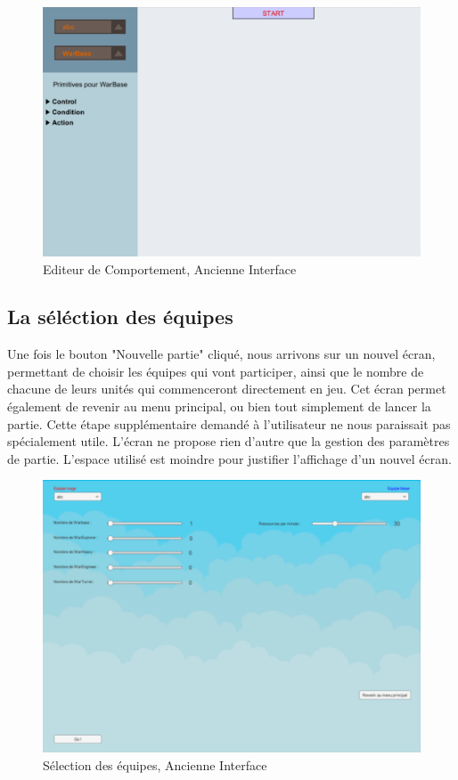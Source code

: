 \documentclass{report}
\begin{document}
\begin{enumerate}
\begin{figure}[!h]
	\centering
		\includegraphics[scale=0.35]{BehaviorScreenOld}
	\caption{Editeur de Comportement, Ancienne Interface}
\end{figure}

\end{enumerate}


\subsection{La séléction des équipes}
Une fois le bouton "Nouvelle partie" cliqué, nous arrivons sur un nouvel écran, permettant de choisir les équipes qui vont participer, ainsi que le nombre de chacune de leurs unités qui commenceront directement en jeu.\newline
Cet écran permet également de revenir au menu principal, ou bien tout simplement de lancer la partie. Cette étape supplémentaire demandé à l'utilisateur ne nous paraissait pas spécialement utile. L'écran ne propose rien d'autre que la gestion des paramètres de partie. L'espace utilisé est moindre pour justifier l'affichage d'un nouvel écran.

\begin{figure}[!h]
	\centering
		\includegraphics[scale=0.40]{SettingsOld}
	\caption{Sélection des équipes, Ancienne Interface}
\end{figure}
\end{document}

